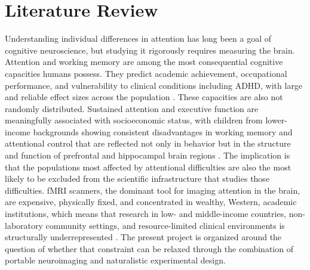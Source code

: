 
\section{Literature Review}

Understanding individual differences in attention has long been a goal of cognitive neuroscience, but studying it rigorously requires measuring the brain. Attention and working memory are among the most consequential cognitive capacities humans possess. They predict academic achievement, occupational performance, and vulnerability to clinical conditions including ADHD, with large and reliable effect sizes across the population \citep{kofler2013}. These capacities are also not randomly distributed. Sustained attention and executive function are meaningfully associated with socioeconomic status, with children from lower-income backgrounds showing consistent disadvantages in working memory and attentional control that are reflected not only in behavior but in the structure and function of prefrontal and hippocampal brain regions \citep{farah2006, noble2015}. The implication is that the populations most affected by attentional difficulties are also the most likely to be excluded from the scientific infrastructure that studies those difficulties. fMRI scanners, the dominant tool for imaging attention in the brain, are expensive, physically fixed, and concentrated in wealthy, Western, academic institutions, which means that research in low- and middle-income countries, non-laboratory community settings, and resource-limited clinical environments is structurally underrepresented \citep{burns2019}. The present project is organized around the question of whether that constraint can be relaxed through the combination of portable neuroimaging and naturalistic experimental design.

